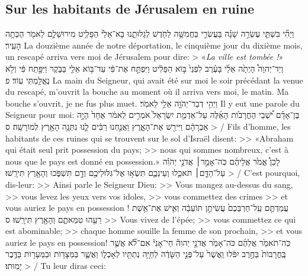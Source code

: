 \begin{paracol}[1]
  \subsection*{Sur les habitants de Jérusalem en ruine}
  \verset
  {וַיְהִ֞י בִּשְׁתֵּ֧י עֶשְׂרֵ֣ה שָׁנָ֗ה בָּעֲשִׂרִ֛י בַּחֲמִשָּׁ֥ה לַחֹ֖דֶשׁ לְגָלוּתֵ֑נוּ
    בָּא־אֵלַ֙י הַפָּלִ֧יט מִירוּשָׁלִַ֛ם לֵאמֹ֖ר
    הֻכְּתָ֥ה הָעִֽיר׃}
  {La douzième année de notre déportation, le cinquième jour du dixième mois,
    un rescapé arriva vers moi de Jérusalem pour dire:
    > «\textit{La ville est tombée !}»}
  \verset
  {וְיַד־יְהוָה֩ הָיְתָ֙ה אֵלַ֜י בָּעֶ֗רֶב לִפְנֵי֙ בּ֣וֹא הַפָּלִ֔יט
    וַיִּפְתַּ֣ח אֶת־פִּ֔י עַד־בּ֥וֹא אֵלַ֖י בַּבֹּ֑קֶר
    וַיִּפָּ֣תַח פִּ֔י וְלֹ֥א נֶאֱלַ֖מְתִּי עֽוֹד׃ פ}
  {La main du Seigneur, qui avait été sur moi le soir précédant la venue du rescapé,
    m’ouvrit la bouche au moment où il arriva vers moi, le matin.
    Ma bouche s’ouvrit, je ne fus plus muet.}
  \verseSpace
  \verset
  {וַיְהִ֥י דְבַר־יְהֹוָ֖ה אֵלַ֥י לֵאמֹֽר׃}
  {Il y eut une parole du Seigneur pour moi:}
  \verset
  {בֶּן־אָדָ֗ם יֹ֠שְׁבֵי הֶחֳרָב֙וֹת הָאֵ֜לֶּה עַל־אַדְמַ֤ת יִשְׂרָאֵל֙ אֹמְרִ֣ים לֵאמֹ֔ר
    אֶחָד֙ הָיָ֣ה אַבְרָהָ֔ם וַיִּירַ֖שׁ אֶת־הָאָ֑רֶץ
    וַאֲנַ֣חְנוּ רַבִּ֔ים לָ֛נוּ נִתְּנָ֥ה הָאָ֖רֶץ לְמוֹרָשָֽׁה׃ ס}
  {> / Fils d’homme, les habitants de ces ruines qui se trouvent sur le sol d’Israël disent:
    >> «Abraham qui était seul prit possession du pays;
    >> nous qui sommes nombreux, c’est à nous que le pays est donné en possession.»}
  \verseSpace
  \verset
  {לָכֵן֩ אֱמֹ֙ר אֲלֵיהֶ֜ם
    כֹּֽה־אָמַ֣ר׀ אֲדֹנָ֣י יְהֹוִ֗ה
    עַל־הַדָּ֧ם׀ תֹּאכֵ֛לוּ
    וְעֵינֵכֶ֛ם תִּשְׂא֥וּ אֶל־גִּלּוּלֵיכֶ֖ם
    וְדָ֣ם תִּשְׁפֹּ֑כוּ
    וְהָאָ֖רֶץ תִּירָֽשׁוּ׃}
  {> / C’est pourquoi, dis-leur:
    >> Ainsi parle le Seigneur Dieu:
    >> Vous mangez au-dessus du sang,
    >> vous levez les yeux vers vos idoles,
    >> vous commettez des crimes
    >> et vous auriez le pays en possession !}
  \verset
  {עֲמַדְתֶּ֤ם עַֽל־חַרְבְּכֶם֙
    עֲשִׂיתֶ֣ן תּוֹעֵבָ֔ה
    וְאִ֛ישׁ אֶת־אֵ֥שֶׁת רֵעֵ֖הוּ טִמֵּאתֶ֑ם
    וְהָאָ֖רֶץ תִּירָֽשׁוּ׃ ס}
  {>> Vous vivez de l’épée;
    >> vous commettez ce qui est abominable;
    >> chaque homme souille la femme de son prochain,
    >> et vous auriez le pays en possession!}
  \verseSpace
  \verset
  {כֹּֽה־תֹאמַ֙ר אֲלֵהֶ֜ם
    כֹּה־אָמַ֙ר אֲדֹנָ֣י יְהוִה֘
    חַי־אָנִי֒
    אִם־לֹ֞א אֲשֶׁ֤ר בֶּֽחֳרָבוֹת֙ בַּחֶ֣רֶב יִפֹּ֔לוּ
    וַֽאֲשֶׁר֙ עַל־פְּנֵ֣י הַשָּׂדֶ֔ה לַחַיָּ֥ה נְתַתִּ֖יו לְאָכְל֑וֹ
    וַאֲשֶׁ֛ר בַּמְּצָד֥וֹת וּבַמְּעָר֖וֹת בַּדֶּ֥בֶר יָמֽוּתוּ׃}
  {> / Tu leur diras ceci:
}
\end{paracol}

